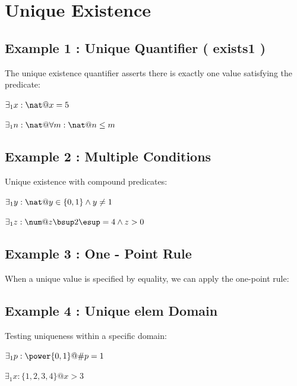 \documentclass[a4paper,10pt,fleqn]{article}
\begin{document}
\section*{Unique Existence}

\subsection*{Example 1 : Unique Quantifier ( exists1 )}

\noindent The unique existence quantifier asserts there is exactly one value satisfying the predicate:

\bigskip

\noindent
$\exists_1 x : \nat @ x = 5$


\noindent
$\exists_1 n : \nat @ \forall m : \nat @ n \leq m$


\subsection*{Example 2 : Multiple Conditions}

\noindent Unique existence with compound predicates:

\bigskip

\noindent
$\exists_1 y : \nat @ y \in \{0, 1\} \land y \neq 1$


\noindent
$\exists_1 z : \num @ z \bsup 2 \esup = 4 \land z > 0$


\subsection*{Example 3 : One - Point Rule}

\noindent When a unique value is specified by equality, we can apply the one-point rule:

\bigskip

\begin{center}
\end{center}
\bigskip

\subsection*{Example 4 : Unique elem Domain}

\noindent Testing uniqueness within a specific domain:

\bigskip

\noindent
$\exists_1 p : \power \{0, 1\} @ \# p = 1$


\noindent
$\exists_1 x : \{1, 2, 3, 4\} @ x > 3$
\end{document}
